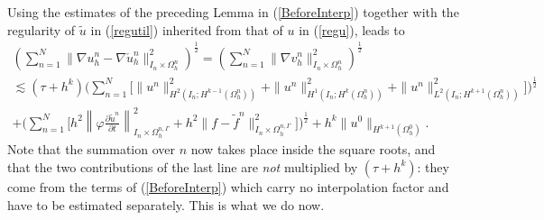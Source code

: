 \documentclass[11pt,a4paper]{article}
\theoremstyle{plain}
\theoremstyle{definition}
\theoremstyle{remark}
\numberwithin{equation}{section}
\begin{document}
Using the estimates of the preceding Lemma in (\ref{BeforeInterp}) together with the regularity of $\tilde{u}$ in (\ref{regutil}) inherited from that of $u$ in (\ref{regu}), leads to
\begin{multline}\label{H1errhitp}
	\left( \sum_{n = 1}^N \| \nabla u^n_h - \nabla \check{u}^n_h \|_{I_n \times\Omega_h^n}^2 \right)^{\frac{1}{2}}
	= \left( \sum_{n = 1}^N \| \nabla v^n_h \|_{I_n \times \Omega_h^n}^2 \right)^{\frac{1}{2}} \\
	\lesssim (\tau + h^k) \Bigg( \sum_{n = 1}^N \Big[ \|u^n \|^2_{H^2 (I_n ; H^{k - 1} (\Omega^n_h))}
	+\|u^n \|^2_{H^1 (I_n ; H^k (\Omega^n_h))} +\|u^n \|^2_{L^2 (I_n ; H^{k +1} (\Omega^n_h))} \Big] \Bigg)^{\frac{1}{2}} \\
	+ \Bigg( \sum_{n = 1}^N \Big[ h^2 \left\| \varphi \frac{\partial	\tilde{u}^n}{\partial t} \right\|_{I_n \times {\Omega_h^{n,\Gamma}}}^2
	+ h^2 \|f - \tilde{f}^n \|^2_{I_n \times {\Omega_h^{n,\Gamma}}} \Big] \Bigg)^{\frac{1}{2}}
	+ h^{k} \| u^0 \|_{H^{k+1} (\Omega_h^0)} .
\end{multline}
Note that the summation over $n$ now takes place inside the square roots, and that the two contributions of the last line are \emph{not} multiplied by $(\tau+h^k)$: they come from the terms of (\ref{BeforeInterp}) which carry no interpolation factor and have to be estimated separately. This is what we do now.
\end{document}
